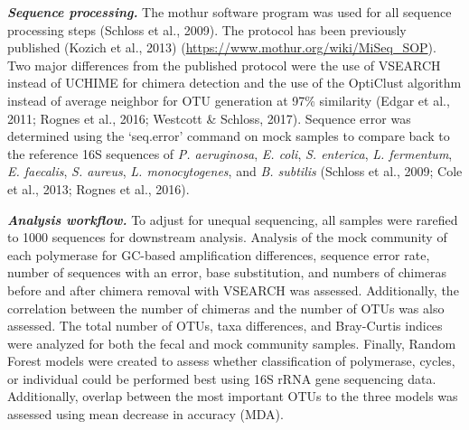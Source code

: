 \documentclass[11pt,]{article}
\begin{document}
\textbf{\emph{Sequence processing.}} The mothur software program was
used for all sequence processing steps (Schloss et al., 2009). The
protocol has been previously published (Kozich et al., 2013)
(\url{https://www.mothur.org/wiki/MiSeq_SOP}). Two major differences
from the published protocol were the use of VSEARCH instead of UCHIME
for chimera detection and the use of the OptiClust algorithm instead of
average neighbor for OTU generation at 97\% similarity (Edgar et al.,
2011; Rognes et al., 2016; Westcott \& Schloss, 2017). Sequence error
was determined using the `seq.error' command on mock samples to compare
back to the reference 16S sequences of \emph{P. aeruginosa}, \emph{E.
coli}, \emph{S. enterica}, \emph{L. fermentum}, \emph{E. faecalis},
\emph{S. aureus}, \emph{L. monocytogenes}, and \emph{B. subtilis}
(Schloss et al., 2009; Cole et al., 2013; Rognes et al., 2016).

\textbf{\emph{Analysis workflow.}} To adjust for unequal sequencing, all
samples were rarefied to 1000 sequences for downstream analysis.
Analysis of the mock community of each polymerase for GC-based
amplification differences, sequence error rate, number of sequences with
an error, base substitution, and numbers of chimeras before and after
chimera removal with VSEARCH was assessed. Additionally, the correlation
between the number of chimeras and the number of OTUs was also assessed.
The total number of OTUs, taxa differences, and Bray-Curtis indices were
analyzed for both the fecal and mock community samples. Finally, Random
Forest models were created to assess whether classification of
polymerase, cycles, or individual could be performed best using 16S rRNA
gene sequencing data. Additionally, overlap between the most important
OTUs to the three models was assessed using mean decrease in accuracy
(MDA).
\end{document}
